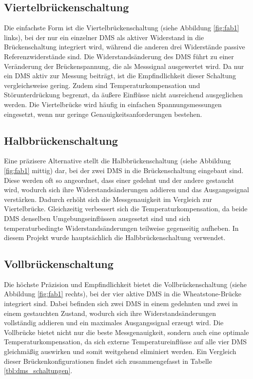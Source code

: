 \subsection{Viertelbrückenschaltung}
Die einfachste Form ist die Viertelbrückenschaltung (siehe Abbildung \ref{fig:fab1} links), bei der nur ein einzelner DMS als aktiver Widerstand in die Brückenschaltung integriert wird, während die anderen drei Widerstände passive Referenzwiderstände sind. Die Widerstandsänderung des DMS führt zu einer Veränderung der Brückenspannung, die als Messsignal ausgewertet wird. Da nur ein DMS aktiv zur Messung beiträgt, ist die Empfindlichkeit dieser Schaltung vergleichsweise gering. Zudem sind Temperaturkompensation und Störunterdrückung begrenzt, da äußere Einflüsse nicht ausreichend ausgeglichen werden. Die Viertelbrücke wird häufig in einfachen Spannungsmessungen eingesetzt, wenn nur geringe Genauigkeitsanforderungen bestehen.

\subsection{Halbbrückenschaltung}
Eine präzisere Alternative stellt die Halbbrückenschaltung  (siehe Abbildung \ref{fig:fab1} mittig) dar, bei der zwei DMS in die Brückenschaltung eingebaut sind. Diese werden oft so angeordnet, dass einer gedehnt und der andere gestaucht wird, wodurch sich ihre Widerstandsänderungen addieren und das Ausgangssignal verstärken. Dadurch erhöht sich die Messgenauigkeit im Vergleich zur Viertelbrücke. Gleichzeitig verbessert sich die Temperaturkompensation, da beide DMS denselben Umgebungseinflüssen ausgesetzt sind und sich temperaturbedingte Widerstandsänderungen teilweise gegenseitig aufheben. In diesem Projekt wurde hauptsächlich die Halbbrückenschaltung verwendet.

\subsection{Vollbrückenschaltung}
Die höchste Präzision und Empfindlichkeit bietet die Vollbrückenschaltung  (siehe Abbildung \ref{fig:fab1} rechts), bei der vier aktive DMS in die Wheatstone-Brücke integriert sind. Dabei befinden sich zwei DMS in einem gedehnten und zwei in einem gestauchten Zustand, wodurch sich ihre Widerstandsänderungen vollständig addieren und ein maximales Ausgangssignal erzeugt wird. Die Vollbrücke bietet nicht nur die beste Messgenauigkeit, sondern auch eine optimale Temperaturkompensation, da sich externe Temperatureinflüsse auf alle vier DMS gleichmäßig auswirken und somit weitgehend eliminiert werden.
Ein Vergleich dieser Brückenkonfigurationen findet sich zusammengefasst in Tabelle \ref{tbl:dms_schaltungen}.



